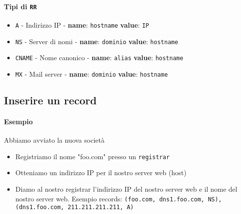         \paragraph{Tipi di \texttt{RR}}
        \begin{itemize}
            \item \texttt{A} - Indirizzo IP - \textbf{name}: \texttt{hostname} \textbf{value}: \texttt{IP}
            \item \texttt{NS} - Server di nomi - \textbf{name}: \texttt{dominio} \textbf{value}: \texttt{hostname}
            \item \texttt{CNAME} - Nome canonico - \textbf{name}: \texttt{alias} \textbf{value}: \texttt{hostname}
            \item \texttt{MX} - Mail server - \textbf{name}: \texttt{dominio} \textbf{value}: \texttt{hostname}
        \end{itemize}
    \subsection{Inserire un record}
        \paragraph{Esempio} Abbiamo avviato la nuova società
        \begin{itemize}
            \item Registriamo il nome "foo.com" presso un \texttt{registrar}
            \item Otteniamo un indirizzo IP per il nostro server web (host)
            \item Diamo al nostro registrar l'indirizzo IP del nostro server web e il nome del nostro server web. Esempio records: \texttt{(foo.com, dns1.foo.com, NS), (dns1.foo.com, 211.211.211.211, A)}
        \end{itemize}
